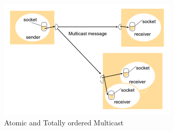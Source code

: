 \begin{figure}[!h]
    \centering
    \includegraphics[width=.7\linewidth]{images/multicastCommunication/totalyordered.png}
    \caption{Atomic and Totally ordered Multicast}
\end{figure}